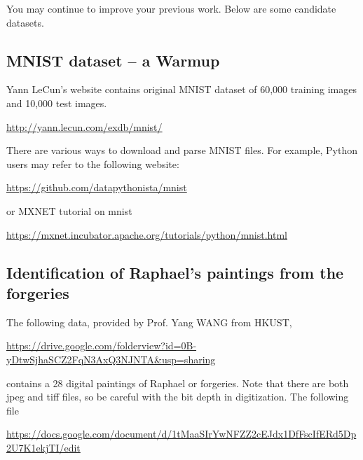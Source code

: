 \documentclass[11pt]{article}
\begin{document}
You may continue to improve your previous work. Below are some candidate datasets. 

\subsection{MNIST dataset -- a Warmup}

Yann LeCun's website contains original MNIST dataset of 60,000 training images and 10,000 test images. 

\url{http://yann.lecun.com/exdb/mnist/}

There are various ways to download and parse MNIST files. For example, Python users may refer to the following website:

\url{https://github.com/datapythonista/mnist}

or MXNET tutorial on mnist

\url{https://mxnet.incubator.apache.org/tutorials/python/mnist.html}


\subsection{Identification of Raphael's paintings from the forgeries}

The following data, provided by Prof. Yang WANG from HKUST,

\url{https://drive.google.com/folderview?id=0B-yDtwSjhaSCZ2FqN3AxQ3NJNTA&usp=sharing}

\noindent contains a 28 digital paintings of Raphael or forgeries. Note that there are both jpeg and tiff files, so be careful with the bit depth in digitization. The following file

\url{https://docs.google.com/document/d/1tMaaSIrYwNFZZ2cEJdx1DfFscIfERd5Dp2U7K1ekjTI/edit}
\end{document}
